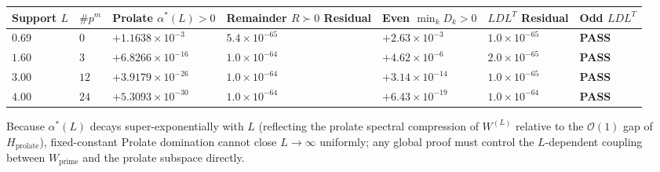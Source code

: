 \documentclass[
  11pt,
]{article}
\newcounter{none} %
\begin{document}
\begin{enumerate}
  {\def\LTcaptype{none} %
  \begin{longtable}[]{@{}
    >{\centering\arraybackslash}p{}
    >{\centering\arraybackslash}p{}
    >{\centering\arraybackslash}p{}
    >{\centering\arraybackslash}p{}
    >{\centering\arraybackslash}p{}
    >{\centering\arraybackslash}p{}
    >{\centering\arraybackslash}p{}@{}}
  \toprule\noalign{}
  \begin{minipage}[b]{\linewidth}\centering
  Support \(L\)
  \end{minipage} & \begin{minipage}[b]{\linewidth}\centering
  \(\#p^m\)
  \end{minipage} & \begin{minipage}[b]{\linewidth}\centering
  Prolate \(\alpha^*(L) > 0\)
  \end{minipage} & \begin{minipage}[b]{\linewidth}\centering
  Remainder \(R \succ 0\) Residual
  \end{minipage} & \begin{minipage}[b]{\linewidth}\centering
  Even \(\min_k D_k > 0\)
  \end{minipage} & \begin{minipage}[b]{\linewidth}\centering
  \(LDL^T\) Residual
  \end{minipage} & \begin{minipage}[b]{\linewidth}\centering
  Odd \(LDL^T\)
  \end{minipage} \\
  \midrule\noalign{}
  \endhead
  \bottomrule\noalign{}
  \endlastfoot
  \(0.69\) & \(0\) & \(+1.1638 \times 10^{-3}\) &
  \(5.4 \times 10^{-65}\) & \(+2.63 \times 10^{-3}\) &
  \(1.0 \times 10^{-65}\) & \textbf{PASS} \\
  \(1.60\) & \(3\) & \(+6.8266 \times 10^{-16}\) &
  \(1.0 \times 10^{-64}\) & \(+4.62 \times 10^{-6}\) &
  \(2.0 \times 10^{-65}\) & \textbf{PASS} \\
  \(3.00\) & \(12\) & \(+3.9179 \times 10^{-26}\) &
  \(1.0 \times 10^{-64}\) & \(+3.14 \times 10^{-14}\) &
  \(1.0 \times 10^{-65}\) & \textbf{PASS} \\
  \(4.00\) & \(24\) & \(+5.3093 \times 10^{-30}\) &
  \(1.0 \times 10^{-64}\) & \(+6.43 \times 10^{-19}\) &
  \(1.0 \times 10^{-64}\) & \textbf{PASS} \\
  \end{longtable}
  }

  Because \(\alpha^*(L)\) decays super-exponentially with \(L\)
  (reflecting the prolate spectral compression of \(W^{(L)}\) relative
  to the \(\mathcal{O}(1)\) gap of \(H_{\text{prolate}}\)),
  fixed-constant Prolate domination cannot close \(L \to \infty\)
  uniformly; any global proof must control the \(L\)-dependent coupling
  between \(W_{\text{prime}}\) and the prolate subspace directly.
\end{enumerate}
\end{document}
